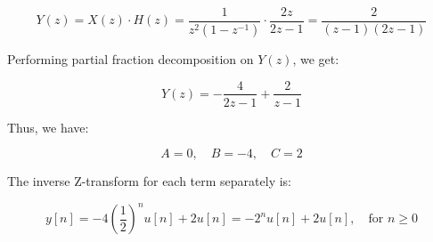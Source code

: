 \begin{equation*}
    Y(z) = X(z) \cdot H(z) = \frac{1}{z^2(1 - z^{-1})} \cdot \frac{2z}{2z - 1} = \frac{2}{(z - 1)(2z - 1)}
\end{equation*}

Performing partial fraction decomposition on \(Y(z)\), we get:

\begin{equation*}
    Y(z) = -\frac{4}{2z - 1} + \frac{2}{z - 1}
\end{equation*}

Thus, we have:

\begin{equation*}
    A = 0, \quad B = -4, \quad C = 2
\end{equation*}

The inverse Z-transform for each term separately is:

\begin{equation*}
    y[n] = -4 \left( \frac{1}{2} \right)^n u[n] + 2u[n] = -2^n u[n] + 2u[n], \quad \text{for } n \geq 0
\end{equation*}
